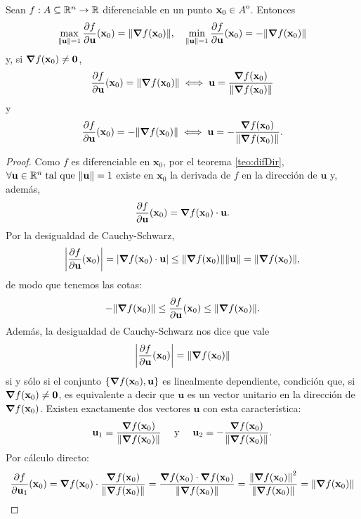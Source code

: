 \begin{theorem}
 Sean $f: A  \subseteq  \mathbb{R}^n \to \mathbb{R}$ diferenciable en un punto $\mathbf{x}_0 \in {\kern0ptA}^{\mathrm{o}}$. Entonces 
 \[
  \max_{\norm{{\mathbf{u}}} = 1} \frac{\partial f}{\partial {\mathbf{u}}} (\mathbf{x}_0) = \norm{\grad f (\mathbf{x}_0)}, \quad 
  \min_{\norm{{\mathbf{u}}} = 1} \frac{\partial f}{\partial {\mathbf{u}}} (\mathbf{x}_0) = -\norm{\grad f (\mathbf{x}_0)}
 \]
y, si $\grad f(\mathbf{x}_0) \ne \mathbf{0}$,
\[
 \frac{\partial f}{\partial {\mathbf{u}}} (\mathbf{x}_0) = \norm{\grad f (\mathbf{x}_0)} \iff {\mathbf{u}} = \frac{\grad f(\mathbf{x}_0)}{\norm{\grad f(\mathbf{x}_0)}}
\]
y
\[
 \frac{\partial f}{\partial {\mathbf{u}}} (\mathbf{x}_0) = -\norm{\grad f (\mathbf{x}_0)} \iff {\mathbf{u}} = -\frac{\grad f(\mathbf{x}_0)}{\norm{\grad f(\mathbf{x}_0)}}.
\]
\begin{proof}  Como $f$ es diferenciable en $\mathbf{x}_0$, por el teorema \eqref{teo:difDir}, $\forall {\mathbf{u}} \in \mathbb{R}^n\;\text{tal que } \norm{{\mathbf{u}}} = 1$ existe en $\mathbf{x}_0$ la derivada de $f$ en la direcci\'on de ${\mathbf{u}}$ y, adem\'as,
\[
 \frac{\partial f}{\partial {\mathbf{u}}} (\mathbf{x}_0) = \grad f (\mathbf{x}_0) \cdot {\mathbf{u}}.
\]
Por la desigualdad de Cauchy-Schwarz, 
\[
 \abs{\frac{\partial f}{\partial {\mathbf{u}}} (\mathbf{x}_0)} = \abs{\grad f (\mathbf{x}_0) \cdot {\mathbf{u}}} \le \norm{\grad f (\mathbf{x}_0)}\norm{{\mathbf{u}}} = \norm{\grad f (\mathbf{x}_0)},
\]
de modo que tenemos las cotas:
\[
 -\norm{\grad f (\mathbf{x}_0)} \le \frac{\partial f}{\partial {\mathbf{u}}}(\mathbf{x}_0) \le \norm{\grad f (\mathbf{x}_0)}.
\]
Adem\'as, la desigualdad de Cauchy-Schwarz nos dice que vale
\[
 \abs{\frac{\partial f}{\partial {\mathbf{u}}} (\mathbf{x}_0)} = \norm{\grad f (\mathbf{x}_0)}
\]
si y s\'olo si el conjunto $\{\grad f(\mathbf{x}_0), {\mathbf{u}} \}$ es linealmente dependiente, condici\'on que, si $\grad f(\mathbf{x}_0) \ne \mathbf{0}$, es equivalente a decir que ${\mathbf{u}}$ es un vector unitario en la direcci\'on de $\grad f(\mathbf{x}_0)$. Existen exactamente dos vectores ${\mathbf{u}}$ con esta caracter\'istica:
\[
 {\mathbf{u}}_1 = \frac{\grad f(\mathbf{x}_0)}{\norm{\grad f(\mathbf{x}_0)}} \quad \text{ y } \quad {\mathbf{u}}_2 = -\frac{\grad f(\mathbf{x}_0)}{\norm{\grad f(\mathbf{x}_0)}}.
\]
Por c\'alculo directo:
\begin{align*}
 \frac{\partial f}{\partial {\mathbf{u}}_1} (\mathbf{x}_0) &= \grad f (\mathbf{x}_0) \cdot \frac{\grad f(\mathbf{x}_0)}{\norm{\grad f(\mathbf{x}_0)}} = \frac{ \grad f (\mathbf{x}_0) \cdot \grad f(\mathbf{x}_0) }{\norm{\grad f(\mathbf{x}_0)}} = \frac{\norm{\grad f (\mathbf{x}_0)}^2 }{\norm{\grad f(\mathbf{x}_0)}} = \norm{\grad f (\mathbf{x}_0)} \\

\end{align*}
\end{proof}
\end{theorem}
